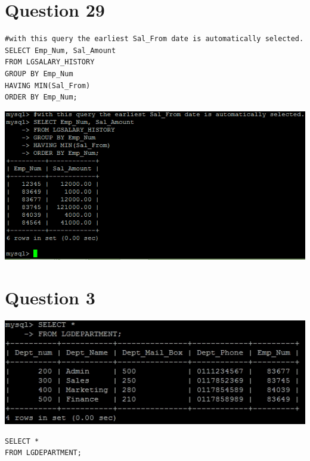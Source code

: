 \documentclass[a4paper,10pt]{article}
\begin{document}
\section*{Question 29}
\lstset{
            language=SQL,
            breaklines=true
            }
        \begin{lstlisting}[frame=single]
        #with this query the earliest Sal_From date is automatically selected.
SELECT Emp_Num, Sal_Amount
FROM LGSALARY_HISTORY
GROUP BY Emp_Num
HAVING MIN(Sal_From)
ORDER BY Emp_Num;

        \end{lstlisting}
\includegraphics{Queries/Question_29/Question_29_screenshot.PNG}
\section*{Question 3}
\includegraphics{Queries/Question_3/Q3_screenshot.jpg}
\lstset{
            language=SQL,
            breaklines=true
            }
        \begin{lstlisting}[frame=single]
        SELECT *
FROM LGDEPARTMENT;

        \end{lstlisting}
\end{document}
